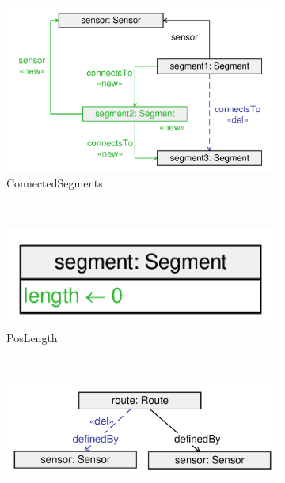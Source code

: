 \begin{figure}
        \centering
        \begin{subfigure}[b]{0.7\textwidth}
                \centering
                \includegraphics[scale=0.4]{figures/transformation-inject-connectedsegments}
                \caption{\textsf{ConnectedSegments}}
                \label{fig:transformation-inject-connectedsegments}
        \end{subfigure}
        ~
        \begin{subfigure}[b]{0.4\textwidth}
        		\centering
                \includegraphics[scale=0.4]{figures/transformation-inject-poslength}
                \caption{\textsf{PosLength}}
                \label{fig:transformation-inject-poslength}
        \end{subfigure}%
        ~
        \begin{subfigure}[b]{0.6\textwidth}
                \centering
                \includegraphics[scale=0.4]{figures/transformation-inject-routesensor}

\end{subfigure}
\end{figure}
